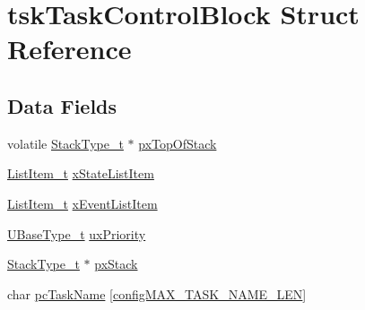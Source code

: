 \hypertarget{structtskTaskControlBlock}{\section{tsk\-Task\-Control\-Block Struct Reference}
\label{structtskTaskControlBlock}
}
\subsection*{Data Fields}
\begin{DoxyCompactItemize}
\item 
volatile \hyperlink{Flsh186_2prtmacro_8h_a84e9a8ba132feed0b2401c1f4e2ac63c}{Stack\-Type\-\_\-t} $\ast$ \hyperlink{structtskTaskControlBlock_a429a186c7f8e34aba1eef5e12d215b90}{px\-Top\-Of\-Stack}
\item 
\hyperlink{list_8h_a1a62d469392f9bfe2443e7efab9c8398}{List\-Item\-\_\-t} \hyperlink{structtskTaskControlBlock_a16e0d20425d53ac78537e1fdb8834cf6}{x\-State\-List\-Item}
\item 
\hyperlink{list_8h_a1a62d469392f9bfe2443e7efab9c8398}{List\-Item\-\_\-t} \hyperlink{structtskTaskControlBlock_a1a1612b6081a13683808284d93a9b28f}{x\-Event\-List\-Item}
\item 
\hyperlink{Flsh186_2prtmacro_8h_a8e88a5e44a5243b3d1c29af17fd6b5bd}{U\-Base\-Type\-\_\-t} \hyperlink{structtskTaskControlBlock_a79187811e3d2a15595942e3b44237d85}{ux\-Priority}
\item 
\hyperlink{Flsh186_2prtmacro_8h_a84e9a8ba132feed0b2401c1f4e2ac63c}{Stack\-Type\-\_\-t} $\ast$ \hyperlink{structtskTaskControlBlock_a9a0d71a9f95dd0609f9911d9efd79134}{px\-Stack}
\item 
char \hyperlink{structtskTaskControlBlock_a67d61291794f38afb5be5132078bc24f}{pc\-Task\-Name} \mbox{[}\hyperlink{FreeRTOSConfig_8h_ac388dc4041aab6997348828eb27fc1a8}{config\-M\-A\-X\-\_\-\-T\-A\-S\-K\-\_\-\-N\-A\-M\-E\-\_\-\-L\-E\-N}\mbox{]}
\end{DoxyCompactItemize}


